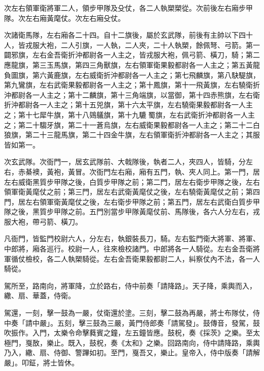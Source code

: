 \begin{pinyinscope}
 次左右領軍衛將軍二人，領步甲隊及殳仗，各二人執槊槊從。次前後左右廂步甲隊。次左右廂黃麾仗。次左右廂殳仗。



 次諸衛馬隊，左右廂各二十四。自十二旗後，屬於玄武隊，前後有主帥以下四十人，皆戎服大袍，二人引旗，一人執，二人夾，二十人執槊，餘佩弩、弓箭。第一闢邪旗，左右金吾衛折沖都尉各一人主之，皆戎服大袍，佩弓箭、橫刀，騎；第二應龍旗，第三玉馬旗，第四三角獸旗，左右領軍衛果毅都尉各一人主之；第五黃龍負圖旗，第六黃鹿旗，左右威衛折沖都尉各一人主之；第七飛麟旗，第八駃騠旗，第九鸞旗，左右武衛果毅都尉各一人主之；第十鳳旗，第十一飛黃旗，左右驍衛折沖都尉各一人主之；第十二麟旗，第十三角端旗，以當御，第十四赤熊旗，左右衛折沖都尉各一人主之；第十五兕旗，第十六太平旗，左右驍衛果毅都尉各一人主之；第十七犀牛旗，第十八鵕鸃旗，第十九騼蜀旗，左右武衛折沖都尉各一人主之；第二十騶牙旗，第二十一蒼烏旗，左右威衛果毅都尉各一人主之；第二十二白狼旗，第二十三龍馬旗，第二十四金牛旗，左右領軍衛折沖都尉各一人主之；其服皆如第一。



 次玄武隊。次衙門一，居玄武隊前、大戟隊後，執者二人，夾四人，皆騎，分左右，赤綦襖，黃袍，黃冒。次衙門左右廂，廂有五門，執、夾人同上。第一門，居左右威衛黑質步甲隊之後，白質步甲隊之前；第二門，居左右衛步甲隊之後，左右領軍衛黃麾仗之前；第三門，居左右武衛黃麾仗之後，左右驍衛黃麾仗之前；第四門，居左右領軍衛黃麾仗之後，左右衛步甲隊之前；第五門，居左右武衛白質步甲隊之後，黑質步甲隊之前。五門別當步甲隊黃麾仗前、馬隊後，各六人分左右，戎服大袍，帶弓箭、橫刀。



 凡衙門，皆監門校尉六人，分左右，執銀裝長刀，騎。左右監門衛大將軍、將軍、中郎將，廂各巡行。校尉一人，往來檢校諸門。中郎將各一人騎從。左右金吾衛將軍循仗檢校，各二人執槊騎從。左右金吾衛果毅都尉二人，糾察仗內不法，各一人騎從。



 駕所至，路南向，將軍降，立於路右，侍中前奏「請降路」。天子降，乘輿而入，繖、扇、華蓋，侍衛。



 駕還，一刻，擊一鼓為一嚴，仗衛還於塗。三刻，擊二鼓為再嚴，將士布隊仗，侍中奏「請中嚴」。五刻，擊三鼓為三嚴，黃門侍郎奏「請駕發」。鼓傳音，發駕，鼓吹振作。入門，太樂令命擊蕤賓之鐘，左五鐘皆應。鼓柷，奏《採茨》之樂。至太極門，戛敔，樂止。既入，鼓柷，奏《太和》之樂。回路南向，侍中請降路，乘輿乃入，繖、扇、侍御、警蹕如初。至門，戛吾又，樂止。皇帝入，侍中版奏「請解嚴」。叩鉦，將士皆休。



\end{pinyinscope}